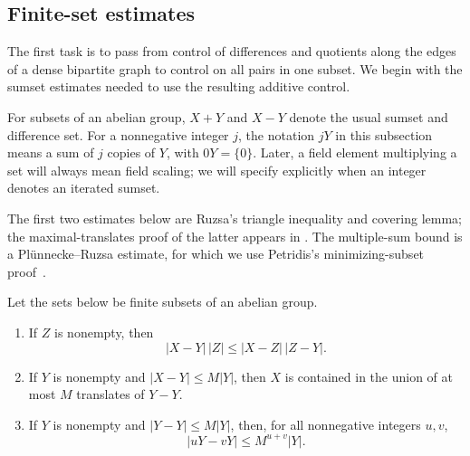\subsection{Finite-set estimates}

The first task is to pass from control of differences and quotients
along the edges of a dense bipartite graph to control on all pairs in
one subset. We begin with the sumset estimates needed to use the
resulting additive control.

For subsets of an abelian group, $X+Y$ and $X-Y$ denote the usual sumset
and difference set. For a nonnegative integer $j$, the notation $jY$
in this subsection means a sum of $j$ copies of $Y$, with $0Y=\{0\}$.
Later, a field element multiplying a set will always mean field scaling;
we will specify explicitly when an integer denotes an iterated sumset.

The first two estimates below are Ruzsa's triangle inequality and
covering lemma; the maximal-translates proof of the latter appears in
\cite[p.~324]{Ruzsa1999}. The multiple-sum bound is a Pl\"unnecke--Ruzsa
estimate, for which we use Petridis's minimizing-subset
proof~\cite[Proposition 2.1 and Section 3]{Petridis2012}.

\begin{lemma}
\label{inc-sumset-estimates}
Let the sets below be finite subsets of an abelian group.
\begin{enumerate}
\item If $Z$ is nonempty, then
\begin{equation}\label{eq:inc-triangle}
 |X-Y|\,|Z|\le |X-Z|\,|Z-Y|.
\end{equation}
\item If $Y$ is nonempty and $|X-Y|\le M|Y|$, then $X$ is contained in
the union of at most $M$ translates of $Y-Y$.
\item If $Y$ is nonempty and $|Y-Y|\le M|Y|$, then, for all nonnegative
integers $u,v$,
\begin{equation}\label{eq:inc-multiple-sums}
 |uY-vY|\le M^{u+v}|Y|.
\end{equation}
\end{enumerate}
\end{lemma}

